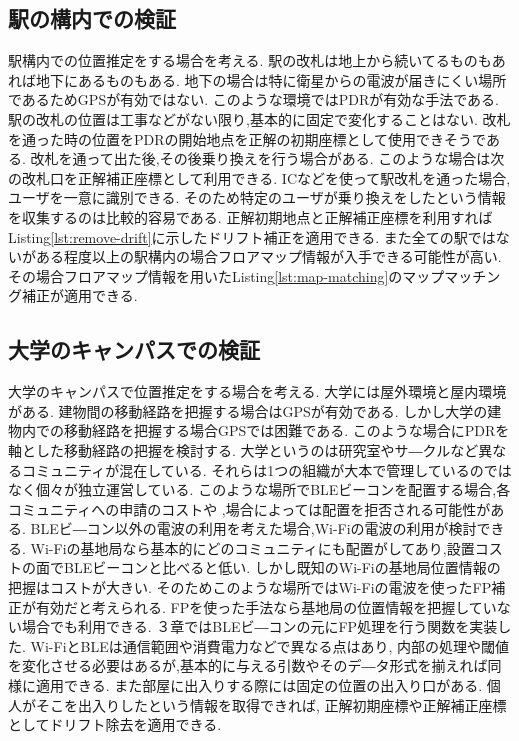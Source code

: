 \subsection{駅の構内での検証}
駅構内での位置推定をする場合を考える.
駅の改札は地上から続いてるものもあれば地下にあるものもある.
地下の場合は特に衛星からの電波が届きにくい場所であるためGPSが有効ではない.
このような環境ではPDRが有効な手法である.
駅の改札の位置は工事などがない限り,基本的に固定で変化することはない.
改札を通った時の位置をPDRの開始地点を正解の初期座標として使用できそうである.
改札を通って出た後,その後乗り換えを行う場合がある.
このような場合は次の改札口を正解補正座標として利用できる.
ICなどを使って駅改札を通った場合,ユーザを一意に識別できる.
そのため特定のユーザが乗り換えをしたという情報を収集するのは比較的容易である.
正解初期地点と正解補正座標を利用すればListing\ref{lst:remove-drift}に示したドリフト補正を適用できる.
また全ての駅ではないがある程度以上の駅構内の場合フロアマップ情報が入手できる可能性が高い.
その場合フロアマップ情報を用いたListing\ref{lst:map-matching}のマップマッチング補正が適用できる.

\subsection{大学のキャンパスでの検証}
大学のキャンパスで位置推定をする場合を考える.
大学には屋外環境と屋内環境がある.
建物間の移動経路を把握する場合はGPSが有効である.
しかし大学の建物内での移動経路を把握する場合GPSでは困難である.
このような場合にPDRを軸とした移動経路の把握を検討する.
大学というのは研究室やサ―クルなど異なるコミュニティが混在している.
それらは1つの組織が大本で管理しているのではなく個々が独立運営している.
このような場所でBLEビーコンを配置する場合,各コミュニティへの申請のコストや
,場合によっては配置を拒否される可能性がある.
BLEビ―コン以外の電波の利用を考えた場合,Wi-Fiの電波の利用が検討できる.
Wi-Fiの基地局なら基本的にどのコミュニティにも配置がしてあり,設置コストの面でBLEビーコンと比べると低い.
しかし既知のWi-Fiの基地局位置情報の把握はコストが大きい.
そのためこのような場所ではWi-Fiの電波を使ったFP補正が有効だと考えられる.
FPを使った手法なら基地局の位置情報を把握していない場合でも利用できる.
３章ではBLEビ―コンの元にFP処理を行う関数を実装した.
Wi-FiとBLEは通信範囲や消費電力などで異なる点はあり,
内部の処理や閾値を変化させる必要はあるが,基本的に与える引数やそのデ―タ形式を揃えれば同様に適用できる.
また部屋に出入りする際には固定の位置の出入り口がある.
個人がそこを出入りしたという情報を取得できれば,
正解初期座標や正解補正座標としてドリフト除去を適用できる.


